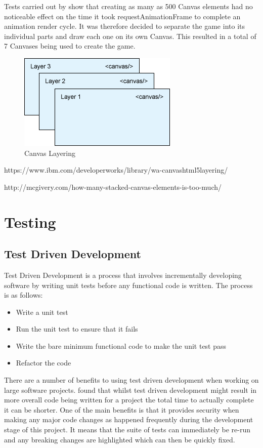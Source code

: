 \documentclass[12pt,a4paper]{report}
\begin{document}
Tests carried out by show that creating as many as 500 Canvas elements had no noticeable effect on the time it took requestAnimationFrame to complete an animation render cycle. It was therefore decided to separate the game into its individual parts and draw each one on its own Canvas. This resulted in a total of 7 Canvases being used to create the game.

\begin{figure}[h]
\centering
    \includegraphics[scale=0.5]{canvasLayers}
    \caption{Canvas Layering}
    \label{fig:canvasLayering}
\end{figure}
\FloatBarrier

https://www.ibm.com/developerworks/library/wa-canvashtml5layering/

http://mcgivery.com/how-many-stacked-canvas-elements-is-too-much/

\chapter{Testing}

\section{Test Driven Development}
Test Driven Development is a process that involves incrementally developing software by writing unit tests before any functional code is written. The process is as follows:

\begin{itemize}
   \item Write a unit test
   \item Run the unit test to ensure that it fails
   \item Write the bare minimum functional code to make the unit test pass
   \item Refactor the code
\end{itemize}
   
   There are a number of benefits to using test driven development when working on large software projects. \cite{muller2003return} found that whilst test driven development might result in more overall code being written for a project the total time to actually complete it can be shorter. One of the main benefits is that it provides security when making any major code changes as happened frequently during the development stage of this project. It means that the suite of tests can immediately be re-run and any breaking changes are highlighted which can then be quickly fixed.
\end{document}
